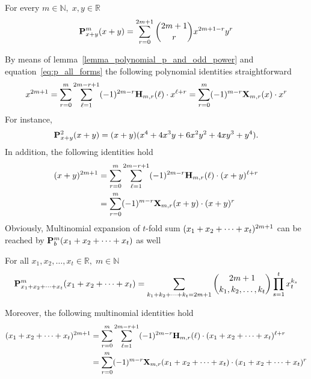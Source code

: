 \begin{lem}
    \label{lemma_polynomial_p_and_odd_power}
    For every $m\in\mathbb{N}, \; x,y\in\mathbb{R}$
    \begin{equation*}
        \polynomialP{m}{x+y}{x+y} = \sum_{r=0}^{2m+1} \binom{2m+1}{r} x^{2m+1-r} y^r
    \end{equation*}
\end{lem}
By means of lemma~\ref{lemma_polynomial_p_and_odd_power} and equation~\eqref{eq:p_all_forms} the following
polynomial identities straightforward
\begin{equation*}
    x^{2m+1}
    =\sum_{r=0}^{m} \sum_{\ell=1}^{2m-r+1} (-1)^{2m-r} \coeffH{m}{r}{\ell} \cdot x^{\ell+r}
    =\sum_{r=0}^{m} (-1)^{m-r} \polynomialX{m}{r}{x} \cdot x^r
\end{equation*}
For instance,
\begin{equation*}
    \polynomialP{2}{x+y}{x+y} = (x + y) (x^4 + 4 x^3 y + 6 x^2 y^2 + 4 x y^3 + y^4).
\end{equation*}
In addition, the following identities hold
\begin{equation*}
    \begin{split}
    (x+y)
        ^{2m+1}
        &=\sum_{r=0}^{m} \sum_{\ell=1}^{2m-r+1} (-1)^{2m-r} \coeffH{m}{r}{\ell} \cdot (x+y)^{\ell+r} \\
        &=\sum_{r=0}^{m} (-1)^{m-r} \polynomialX{m}{r}{x+y} \cdot (x+y)^r
    \end{split}
\end{equation*}
Obviously, Multinomial expansion of $t$-fold sum $(\multifoldSum{t})^{2m+1}$ can be reached
by $\polynomialP{m}{b}{\multifoldSum{t}}$ as well
\begin{cor}
    For all $x_1,x_2,\ldots, x_t\in\mathbb{R}, \; m \in \mathbb{N}$
    \begin{equation*}
        \polynomialP{m}{\multifoldSum{t}}{\multifoldSum{t}}
        =
        \sum_{\multifoldSum[k]{t}=2m+1} \binom{2m+1}{k_1, k_2,\ldots, k_t} \prod_{s=1}^{t} x_t^{k_s}
    \end{equation*}
\end{cor}
Moreover, the following multinomial identities hold
\begin{equation*}
    \begin{split}
    (\multifoldSum{t})
        ^{2m+1}
        &=\sum_{r=0}^{m} \sum_{\ell=1}^{2m-r+1} (-1)^{2m-r} \coeffH{m}{r}{\ell} \cdot (\multifoldSum{t})^{\ell+r} \\
        &=\sum_{r=0}^{m} (-1)^{m-r} \polynomialX{m}{r}{\multifoldSum{t}} \cdot (\multifoldSum{t})^r
    \end{split}
\end{equation*}
